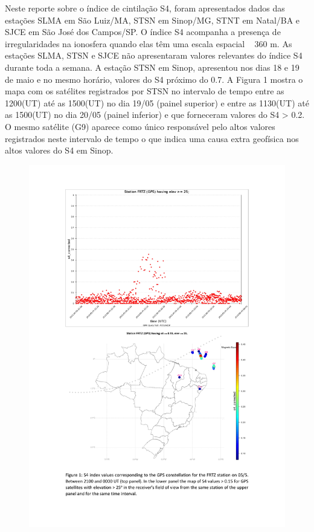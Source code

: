 \documentclass[a4paper, 10pt]{article}
\begin{document}
Neste reporte sobre o índice de cintilação S4, foram apresentados dados das 
estações SLMA em São Luiz/MA, STSN em Sinop/MG, STNT em Natal/BA e 
SJCE em São José dos Campos/SP. O índice S4 acompanha a presença de 
irregularidades na ionosfera quando elas têm uma escala espacial ~ 360 m.  
As estações SLMA, STSN e SJCE não apresentaram valores relevantes do 
índice S4 durante toda a semana. A estação STSN em Sinop, apresentou nos 
dias 18 e 19 de maio e no mesmo horário, valores do S4 próximo do 0.7. A Figura 
1 mostra o mapa com os satélites registrados por STSN no intervalo de tempo 
entre as 1200(UT) até as 1500(UT) no dia 19/05 (painel superior) e entre as 
1130(UT) até as 1500(UT) no dia 20/05 (painel inferior) e que forneceram valores 
do S4 > 0.2. O mesmo satélite (G9) aparece como único responsável pelo altos 
valores registrados neste intervalo de tempo o que indica uma causa extra 
geofísica nos altos valores do S4 em Sinop. 
\begin{figure}[H]
    
                        \centering
   
                             \includegraphics[width=14cm]{./figures/pt_outfileScint_0.jpg}

                        \end{figure}

                     
\end{document}
